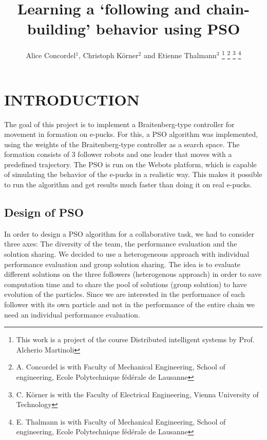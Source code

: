 \documentclass[a4, 10 pt, conference]{ieeeconf}  %
\title{\LARGE \bf
Learning a `following and chain-building' behavior using PSO
}
\author{Alice Concordel$^{1}$, Christoph K\"{o}rner$^{2}$ and Etienne Thalmann$^{3}$%
\thanks{This work is a project of the course Distributed intelligent systems by Prof. Alcherio Martinoli}%
\thanks{A. Concordel is with Faculty of Mechanical Engineering, School of engineering, Ecole Polytechnique fédérale de Lausanne}
\thanks{C. K\"{o}rner is with the Faculty of Electrical Engineering, Vienna University of Technology} %
\thanks{E. Thalmann is with Faculty of Mechanical Engineering, School of engineering, Ecole Polytechnique fédérale de Lausanne}%
}
\begin{document}
\maketitle
\thispagestyle{empty}
\pagestyle{empty}


\begin{abstract}


\end{abstract}


\section{INTRODUCTION}
The goal of this project is to implement a Braitenberg-type controller for movement in formation on e-pucks. For this, a PSO algorithm was implemented, using the weights of the Braitenberg-type controller as a search space. The formation consists of 3 follower robots and one leader that moves with a predefined trajectory. The PSO is run on the Webots platform, which is capable of simulating the behavior of the e-pucks in a realistic way. This makes it possible to run the algorithm and get results much faster than doing it on real e-pucks.

\subsection{Design of PSO}
In order to design a PSO algorithm for a collaborative task, we had to consider three axes: The diversity of the team, the performance evaluation and the solution sharing. We decided  to use a heterogeneous approach with individual performance evaluation and group solution sharing. The idea is to evaluate different solutions on the three followers (heterogenous approach) in order to save computation time and to share the pool of solutions (group solution) to have evolution of the particles. Since we are interested in the performance of each follower with its own particle and not in the performance of the entire chain we need an individual performance evaluation.
\end{document}
